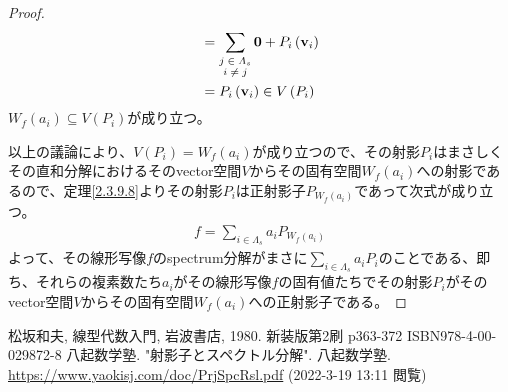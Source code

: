 \documentclass[dvipdfmx]{jsarticle}
\begin{document}
\begin{proof}
\begin{align*}
&= \sum_{\scriptsize \begin{matrix} j \in \varLambda_{s} \\i \neq j \\\end{matrix}} \mathbf{0} + P_{i}\left( \mathbf{v}_{i} \right) \\
&= P_{i}\left( \mathbf{v}_{i} \right) \in V\left( P_{i} \right)
\end{align*}
$W_{f}\left( a_{i} \right) \subseteq V\left( P_{i} \right)$が成り立つ。\par
以上の議論により、$V\left( P_{i} \right) = W_{f}\left( a_{i} \right)$が成り立つので、その射影$P_{i}$はまさしくその直和分解におけるそのvector空間$V$からその固有空間$W_{f}\left( a_{i} \right)$への射影であるので、定理\ref{2.3.9.8}よりその射影$P_{i}$は正射影子$P_{W_{f}\left( a_{i} \right)}$であって次式が成り立つ。
\begin{align*}
f = \sum_{i \in \varLambda_{s}} {a_{i}P_{W_{f}\left( a_{i} \right)}}
\end{align*}
よって、その線形写像$f$のspectrum分解がまさに$\sum_{i \in \varLambda_{s}} {a_{i}P_{i}}$のことである、即ち、それらの複素数たち$a_{i}$がその線形写像$f$の固有値たちでその射影$P_{i}$がそのvector空間$V$からその固有空間$W_{f}\left( a_{i} \right)$への正射影子である。
\end{proof}
\begin{thebibliography}{50}
    松坂和夫, 線型代数入門, 岩波書店, 1980. 新装版第2刷 p363-372 ISBN978-4-00-029872-8
    八起数学塾. "射影子とスペクトル分解". 八起数学塾. \url{https://www.yaokisj.com/doc/PrjSpcRsl.pdf} (2022-3-19 13:11 閲覧)
\end{thebibliography}
\end{document}
